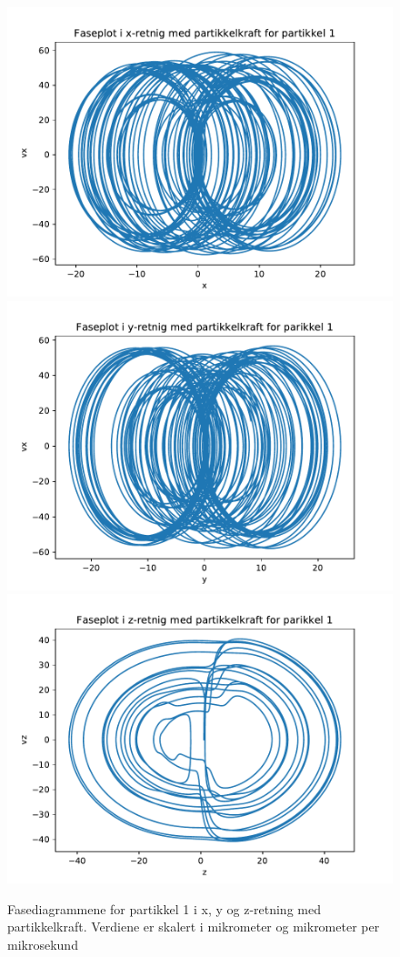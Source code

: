 \documentclass[reprint,english,notitlepage, nofootinbib]{revtex4-1}  %
\begin{document}
\begin{figure}[H]
	\centering 
	\includegraphics[scale=0.4]{../pythonplots/xint1.pdf}
	\includegraphics[scale=0.4]{../pythonplots/yint1.pdf}
	\includegraphics[scale=0.4]{../pythonplots/zint1.pdf}
	\caption{Fasediagrammene for partikkel 1 i x, y og z-retning med partikkelkraft. Verdiene er skalert i mikrometer og mikrometer per mikrosekund}
	\label{Fig:faseint1}
\end{figure}
\end{document}
